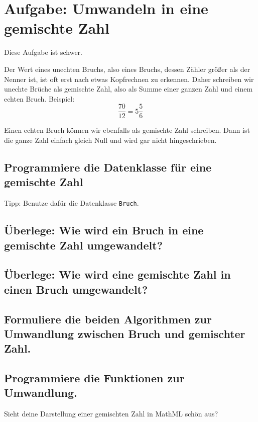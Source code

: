 \section{Aufgabe: Umwandeln in eine gemischte Zahl}

Diese Aufgabe ist schwer.

Der Wert eines unechten Bruchs, also eines Bruchs, dessen Zähler größer als der Nenner ist, ist oft erst nach etwas Kopfrechnen zu erkennen. Daher schreiben wir unechte Brüche als gemischte Zahl, also als Summe einer ganzen Zahl und einem echten Bruch. Beispiel:
\[
\frac{70}{12} = 5 \frac{5}{6}
\]

Einen echten Bruch können wir ebenfalls als gemischte Zahl schreiben. Dann ist die ganze Zahl einfach gleich Null und wird gar nicht hingeschrieben.

\subsection{Programmiere die Datenklasse für eine gemischte Zahl}

Tipp: Benutze dafür die Datenklasse \texttt{Bruch}.

\subsection{Überlege: Wie wird ein Bruch in eine gemischte Zahl umgewandelt?}

\subsection{Überlege: Wie wird eine gemischte Zahl in einen Bruch umgewandelt?}

\subsection{Formuliere die beiden Algorithmen zur Umwandlung zwischen Bruch und gemischter Zahl.}

\subsection{Programmiere die Funktionen zur Umwandlung.}

Sieht deine Darstellung einer gemischten Zahl in MathML schön aus?
